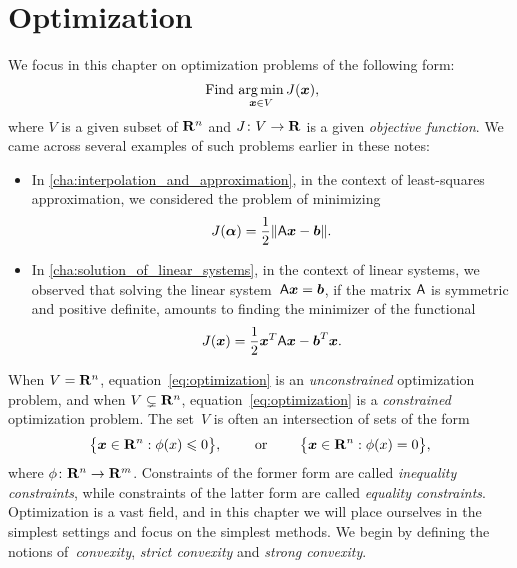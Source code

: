 \chapter{Optimization}%
\label{cha:Optimization}

We focus in this chapter on optimization problems of the following form:
\begin{equation}
    \label{eq:optimization}
    \text{ Find $\operatorname*{arg\,min}_{\mathbf{\boldsymbol{x}} \in V} J(\mathbf{\boldsymbol{x}})$},
\end{equation}
where $V$ is a given subset of $\mathbf R^n$ and $J\colon V \to \mathbf R$ is a given \emph{objective function}.
We came across several examples of such problems earlier in these notes:
\begin{itemize}
    \item
        In \cref{cha:interpolation_and_approximation},
        in the context of least-squares approximation,
        we considered the problem of minimizing
        \[
            J(\mathbf{\boldsymbol{\alpha}}) = \frac{1}{2} \lVert \mathsf A \mathbf{\boldsymbol{x}} - \mathbf{\boldsymbol{b}} \rVert.
        \]

    \item
        In \cref{cha:solution_of_linear_systems},
        in the context of linear systems,
        we observed that solving the linear system~$\mathsf A \mathbf{\boldsymbol{x}} = \mathbf{\boldsymbol{b}}$,
        if the matrix $\mathsf A$ is symmetric and positive definite,
        amounts to finding the minimizer of the functional
        \[
            J(\mathbf{\boldsymbol{x}})  = \frac{1}{2} \mathbf{\boldsymbol{x}}^T \mathsf A \mathbf{\boldsymbol{x}} - \mathbf{\boldsymbol{b}}^T \mathbf{\boldsymbol{x}}.
        \]
\end{itemize}
When $V = \mathbf R^n$,
equation~\eqref{eq:optimization} is an \emph{unconstrained} optimization problem,
and when $V \subsetneq \mathbf R^n$,
equation~\eqref{eq:optimization} is a \emph{constrained} optimization problem.
The set~$V$ is often an intersection of sets of the form
\[
    \bigl\{ \mathbf{\boldsymbol{x}} \in \mathbf R^n : \phi(x) \leqslant 0 \bigr\},
    \qquad
    \text{ or }
    \qquad
    \bigl\{ \mathbf{\boldsymbol{x}} \in \mathbf R^n : \phi(x) = 0 \bigr\},
\]
where $\phi\colon \mathbf R^n \to \mathbf R^m$.
Constraints of the former form are called \emph{inequality constraints},
while constraints of the latter form are called \emph{equality constraints}.
Optimization is a vast field,
and in this chapter we will place ourselves in the simplest settings and focus on the simplest methods.
We begin by defining the notions of~\emph{convexity}, \emph{strict convexity} and \emph{strong convexity}.

